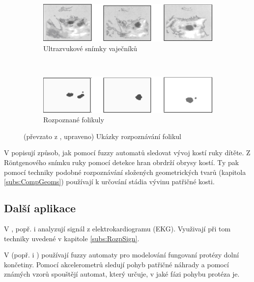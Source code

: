 \documentclass[a4paper,10pt]{article}
\begin{document}
\begin{figure}
  \begin{subfigure}[t]{\textwidth} \centering
    \includegraphics[width=\textwidth]{follicles-1}
    \caption{Ultrazvukové snímky vaječníků} \label{img:Follicles:Screens}
  \end{subfigure}
  \\
  \begin{subfigure}[t]{\textwidth} \centering
    \includegraphics[width=\textwidth]{follicles-2}
    \caption{Rozpoznané folikuly}
  \end{subfigure}
 
  \caption{(převzato z \cite{WanJiaZhoDu-ImProcBasFuzCelAuMod}, upraveno) Ukázky rozpoznávání folikul} \label{img:Follicles}
\end{figure}

V \cite{PatPal-FuzGraSynRecSkeMatXra} popisují způsob, jak pomocí fuzzy automatů sledovat vývoj kostí ruky dítěte. Z Röntgenového snímku ruky pomocí detekce hran obrdrží obrysy kostí. Ty pak pomocí techniky podobné rozpoznávání složených geometrických tvarů (kapitola \ref{subs:CompGeoms}) používají k určování stádia vývinu patřičné kosti.

\subsection{Další aplikace} \label{subs:BioMedRest}
V \cite{PedGac-LeaFuzzAut}, popř. i \cite{RigTza-FuzAutFauDia} analyzují signál z elektrokardiogramu (EKG). Využivají při tom techniky uvedené v kapitole \ref{subs:RozpSign}.

V \cite{Alv-HumGaiModUsGenFuzFinStaMac} (popř. i \cite{AlvTri-ComModQuaPerSig})
používají fuzzy automaty pro modelování fungovaní protézy dolní končetiny. Pomocí akcelerometrů sledují pohyb patřičné náhrady a pomocí známých vzorů spouštějí automat, který určuje, v jaké fázi pohybu protéza je.
\end{document}
